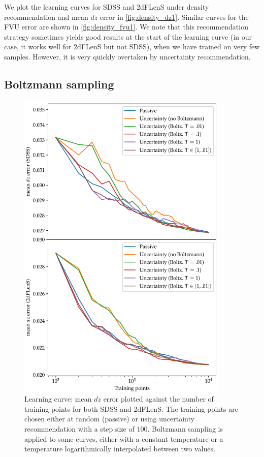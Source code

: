 \documentclass[11pt,twoside,openright]{report}
\begin{document}
  We plot the learning curves for SDSS and 2dFLenS under density recommendation and mean $dz$ error in \cref{fig:density_dz1}. Similar curves for the FVU error are shown in \cref{fig:density_fvu1}. We note that this recommendation strategy sometimes yields good results at the start of the learning curve (in our case, it works well for 2dFLenS but not SDSS), when we have trained on very few samples. However, it is very quickly overtaken by uncertainty recommendation.

\subsection{Boltzmann sampling}

  \begin{figure}
    \centering
    \includegraphics[width=0.9\textwidth]{boltz_uncertainty_dz1.pdf}
    \caption{Learning curve: mean $dz$ error plotted against the number of training points for both SDSS and 2dFLenS. The training points are chosen either at random (passive) or using uncertainty recommendation with a step size of $100$. Boltzmann sampling is applied to some curves, either with a constant temperature or a temperature logarithmically interpolated between two values.}
    \label{fig:boltz_uncertainty_dz1}
  \end{figure}
\end{document}
